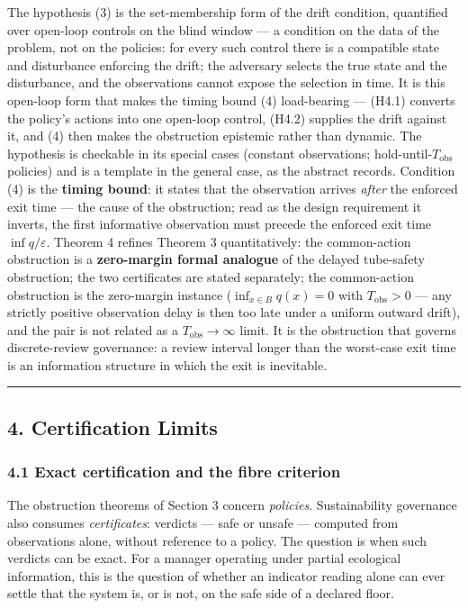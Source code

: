 \documentclass[11pt]{article}
\begin{document}
The hypothesis (3) is the set-membership form of the drift condition,
quantified over open-loop controls on the blind window --- a condition
on the data of the problem, not on the policies: for every such control
there is a compatible state and disturbance enforcing the drift; the
adversary selects the true state and the disturbance, and the
observations cannot expose the selection in time. It is this open-loop
form that makes the timing bound (4) load-bearing --- (H4.1) converts
the policy's actions into one open-loop control, (H4.2) supplies the
drift against it, and (4) then makes the obstruction epistemic rather
than dynamic. The hypothesis is checkable in its special cases (constant
observations; hold-until-\(T_{\mathrm{obs}}\) policies) and is a
template in the general case, as the abstract records. Condition (4) is
the \textbf{timing bound}: it states that the observation arrives
\emph{after} the enforced exit time --- the cause of the obstruction;
read as the design requirement it inverts, the first informative
observation must precede the enforced exit time
\(\inf q / \varepsilon\). Theorem 4 refines Theorem 3 quantitatively:
the common-action obstruction is a \textbf{zero-margin formal analogue}
of the delayed tube-safety obstruction; the two certificates are stated
separately; the common-action obstruction is the zero-margin instance
(\(\inf_{x \in B} q(x) = 0\) with \(T_{\mathrm{obs}} > 0\) --- any
strictly positive observation delay is then too late under a uniform
outward drift), and the pair is not related as a
\(T_{\mathrm{obs}} \to \infty\) limit. It is the obstruction that
governs discrete-review governance: a review interval longer than the
worst-case exit time is an information structure in which the exit is
inevitable.

\begin{center}\rule{0.5\linewidth}{0.5pt}\end{center}

\subsection{4. Certification Limits}\label{certification-limits}

\subsubsection{4.1 Exact certification and the fibre
criterion}\label{exact-certification-and-the-fibre-criterion}

The obstruction theorems of Section 3 concern \emph{policies}.
Sustainability governance also consumes \emph{certificates}: verdicts
--- safe or unsafe --- computed from observations alone, without
reference to a policy. The question is when such verdicts can be exact.
For a manager operating under partial ecological information, this is
the question of whether an indicator reading alone can ever settle that
the system is, or is not, on the safe side of a declared floor.
\end{document}

